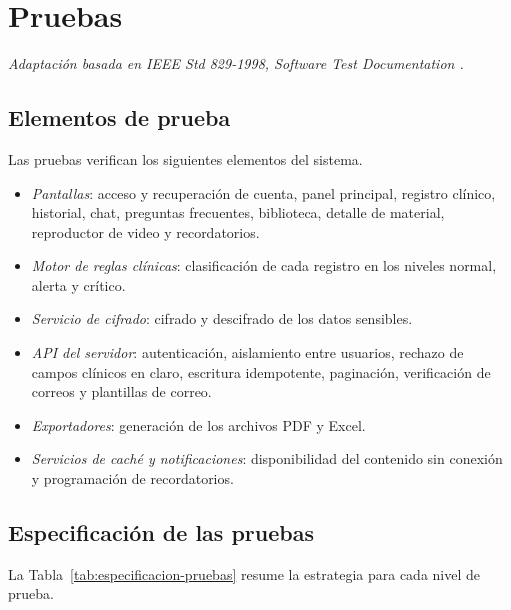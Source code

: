 \chapter[Pruebas]{Pruebas}

\emph{Adaptación basada en IEEE Std 829-1998, Software Test Documentation
\citep{ieee_829_1998}.}

\section[Elementos]{Elementos de prueba}

Las pruebas verifican los siguientes elementos del sistema.

\begin{itemize}
    \item \emph{Pantallas}: acceso y recuperación de cuenta, panel principal,
    registro clínico, historial, chat, preguntas frecuentes, biblioteca, detalle
    de material, reproductor de video y recordatorios.
    \item \emph{Motor de reglas clínicas}: clasificación de cada registro en los
    niveles normal, alerta y crítico.
    \item \emph{Servicio de cifrado}: cifrado y descifrado de los datos
    sensibles.
    \item \emph{API del servidor}: autenticación, aislamiento entre usuarios,
    rechazo de campos clínicos en claro, escritura idempotente, paginación,
    verificación de correos y plantillas de correo.
    \item \emph{Exportadores}: generación de los archivos PDF y Excel.
    \item \emph{Servicios de caché y notificaciones}: disponibilidad del
    contenido sin conexión y programación de recordatorios.
\end{itemize}

\section[Especificación]{Especificación de las pruebas}

La Tabla~\ref{tab:especificacion-pruebas} resume la estrategia para cada nivel
de prueba.

